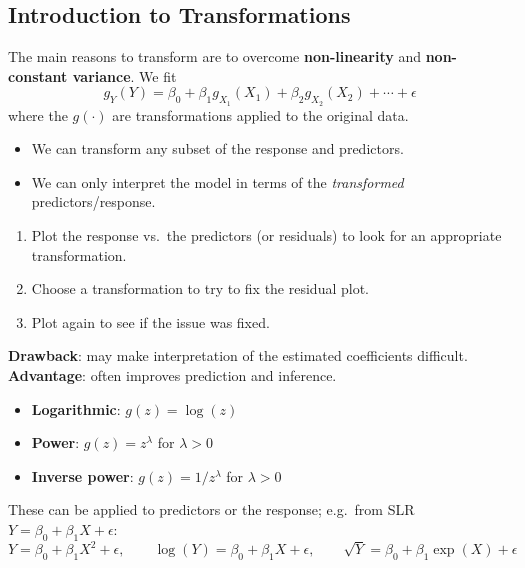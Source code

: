 \subsection{Introduction to Transformations}

\begin{definition}
    The main reasons to transform are to overcome \textbf{non-linearity} and
    \textbf{non-constant variance}. We fit
    \[g_Y(Y)=\beta_0+\beta_1g_{X_1}(X_1)+\beta_2g_{X_2}(X_2)+\cdots+\epsilon\]
    where the $g(\cdot)$ are transformations applied to the original data.
    \begin{itemize}
        \item We can transform any subset of the response and predictors.
        \item We can only interpret the model in terms of the
        \emph{transformed} predictors/response.
    \end{itemize}
\end{definition}

\begin{enumerate}
    \item Plot the response vs.\ the predictors (or residuals) to look for an appropriate transformation.
    \item Choose a transformation to try to fix the residual plot.
    \item Plot again to see if the issue was fixed.
\end{enumerate}
\textbf{Drawback}: may make interpretation of the estimated coefficients difficult.
\textbf{Advantage}: often improves prediction and inference.

\begin{definition}
    \begin{itemize}
        \item \textbf{Logarithmic}: $g(z)=\log(z)$ 
        \item \textbf{Power}: $g(z)=z^\lambda$ for $\lambda>0$
        \item \textbf{Inverse power}: $g(z)=1/z^\lambda$ for $\lambda>0$
    \end{itemize}
     These can be applied to
    predictors or the response; e.g.\ from SLR $Y=\beta_0+\beta_1X+\epsilon$:
    \[Y=\beta_0+\beta_1X^2+\epsilon,\qquad \log(Y)=\beta_0+\beta_1X+\epsilon,\qquad \sqrt Y=\beta_0+\beta_1\exp(X)+\epsilon\]
\end{definition}

